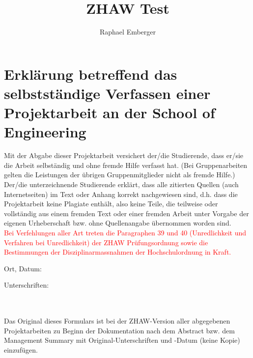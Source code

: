 \documentclass[10pt,a4paper,titlepage,twoside,ngerman]{zhawreprt}
\title{ZHAW Test}
\author{Raphael Emberger}
\begin{document}
\thispagestyle{declaration}
\vspace*{1.6cm}
\section*{Erklärung betreffend das selbstständige Verfassen einer Projektarbeit an der School of Engineering}
\vspace{1.2cm}
Mit der Abgabe dieser Projektarbeit versichert der/die Studierende, dass er/sie die Arbeit selbständig und ohne fremde Hilfe verfasst hat. (Bei Gruppenarbeiten gelten die Leistungen der übrigen Gruppenmitglieder nicht als fremde Hilfe.)
\vspace{1em}\noindent\\
Der/die unterzeichnende Studierende erklärt, dass alle zitierten Quellen (auch Internetseiten) im Text oder Anhang korrekt nachgewiesen sind, d.h. dass die Projektarbeit keine Plagiate enthält, also keine Teile, die teilweise oder vollständig aus einem fremden Text oder einer fremden Arbeit unter Vorgabe der eigenen Urheberschaft bzw. ohne Quellenangabe übernommen worden sind.
\vspace{1em}\noindent\\
\textcolor{red}{Bei Verfehlungen aller Art treten die Paragraphen 39 und 40 (Unredlichkeit und Verfahren bei Unredlichkeit) der ZHAW Prüfungsordnung sowie die Bestimmungen der Disziplinarmassnahmen der Hochschulordnung in Kraft.}\\
\vskip 2.8cm
\begin{minipage}[t]{0.45\textwidth}
Ort, Datum:\vspace{2em}\\
\vspace{2em}\dotfill
\end{minipage}\hfill
\begin{minipage}[t]{0.45\textwidth}
Unterschriften:\vspace{2em}\\
\vspace{2em}\dotfill\\
\vspace{2em}\dotfill\\
\vspace{2em}\dotfill
\end{minipage}
\vfill
Das Original dieses Formulars ist bei der ZHAW-Version aller abgegebenen Projektarbeiten zu Beginn der Dokumentation nach dem Abstract bzw. dem Management Summary mit Original-Unterschriften und -Datum (keine Kopie) einzufügen.
\end{document}
